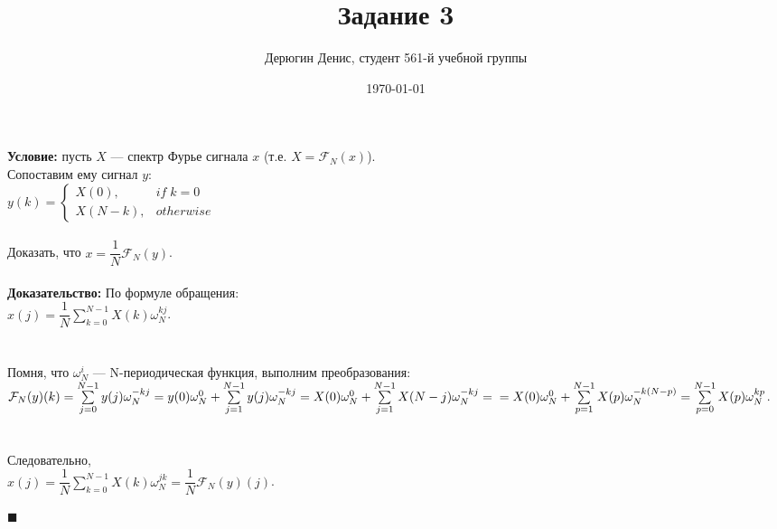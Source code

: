 \documentclass{article}
\title{Задание 3}
\author{
	Дерюгин Денис, студент 561-й учебной группы
}
\date{\today}
\newcommand\proofend{\begin{flushright}$\blacksquare$\end{flushright}}
\begin{document}
\maketitle
\large{
	\textbf{Условие:} пусть $X$ --- спектр Фурье сигнала $x$ (т.е. $X = \mathcal{F}_N(x)$).\\ Сопоставим ему сигнал $y$:\\
	
	$y(k) = \left\{\begin{matrix}
			X(0), & if\;k = 0 \\ 
			X(N - k), & otherwise 
		\end{matrix}\right.$\\
	\\

	Доказать, что $x = \dfrac{1}{N} \mathcal{F}_N(y)$.\\
	\\

	\textbf{Доказательство:} По формуле обращения:\\
	$x(j) = \dfrac{1}{N}\sum\limits_{k = 0}^{N-1} X(k)\omega_N^{kj}$.\\
	\\ \\
	Помня, что $\omega_N^i$ --- N-периодическая функция, выполним преобразования:\\
	$\mathcal{F}_N(y)(k) = \sum\limits_{j = 0}^{N - 1} y(j) \omega_N^{-kj} = y(0) \omega_N^0 + \sum\limits_{j = 1}^{N - 1} y(j) \omega_N^{-kj} = X(0) \omega_N^0 + \sum\limits_{j = 1}^{N - 1} X(N - j) \omega_N^{-kj} =\\ \\ \\= X(0) \omega_N^0 + \sum\limits_{p = 1}^{N - 1} X(p) \omega_N^{-k(N - p)} = \sum\limits_{p = 0}^{N - 1} X(p) \omega_N^{kp}$.\\ \\ \\
	Следовательно,\\
	$x(j) = \dfrac{1}{N}\sum\limits_{k = 0}^{N - 1} X(k) \omega_N^{jk} = \dfrac{1}{N} \mathcal{F}_N(y)(j)$.
	
	\proofend

}
\end{document}
